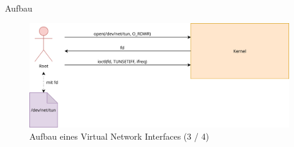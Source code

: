 \documentclass[ngerman,aspectratio=169]{beamer}
\begin{document}
\begin{frame}{Aufbau}
{\begin{figure}
				\includegraphics[width=\textwidth]{open_tun03}
				\caption{Aufbau eines Virtual Network Interfaces (3 / 4)}
			\end{figure}
		}
	\end{frame}
\end{document}
